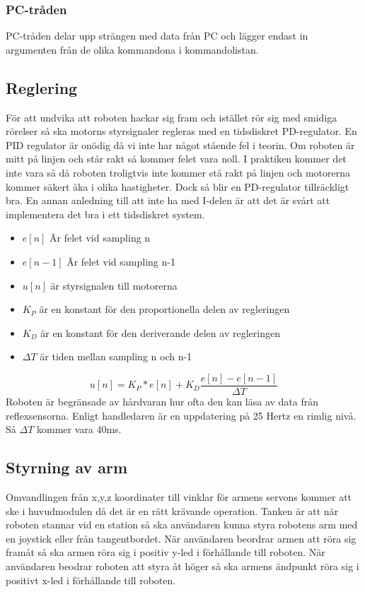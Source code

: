 \subsubsection{PC-tråden}
PC-tråden delar upp strängen med data från PC och lägger endast in argumenten från de olika kommandona i kommandolistan.

\subsection{Reglering}
För att undvika att roboten hackar sig fram och istället rör sig med smidiga rörelser så ska motorns styrsignaler regleras med en tidsdiskret PD-regulator. En PID regulator är onödig då vi inte har något stående fel i teorin. Om roboten är mitt på linjen och står rakt så kommer felet vara noll. I praktiken kommer det inte vara så då roboten troligtvis inte kommer stå rakt på linjen och motorerna kommer säkert åka i olika hastigheter. Dock så blir en PD-regulator tillräckligt bra. En annan anledning till att inte ha med I-delen är att det är svårt att implementera det bra i ett tidsdiskret system. 
\begin{itemize}
\item $e[n]$ Är felet vid sampling n
\item $e[n-1]$ Är felet vid sampling n-1
\item $u[n]$ är styrsignalen till motorerna
\item $K_{P}$ är en konstant för den proportionella delen av regleringen
\item $K_{D}$ är en konstant för den deriverande delen av regleringen
\item $\Delta T$ är tiden mellan sampling n och n-1
 
\end{itemize}
 $$ u[n] = K_P*e[n] + K_D\frac{e[n]-e[n-1]}{\Delta T}$$
 Roboten är begränsade av hårdvaran hur ofta den kan läsa av data från reflexsensorna. Enligt handledaren är en uppdatering på 25 Hertz en rimlig nivå. Så $\Delta T$ kommer vara 40ms. 

 \subsection{Styrning av arm}
 Omvandlingen från x,y,z koordinater till vinklar för armens servons kommer att ske i huvudmodulen då det är en rätt krävande operation. Tanken är att när roboten stannar vid en station så ska användaren kunna styra robotens arm med en joystick eller från tangentbordet. När användaren beordrar armen att röra sig framåt så ska armen röra sig i positiv y-led i förhållande till roboten. När användaren beodrar roboten att styra åt höger så ska armens ändpunkt röra sig i positivt x-led i förhållande till roboten.
 \newline

